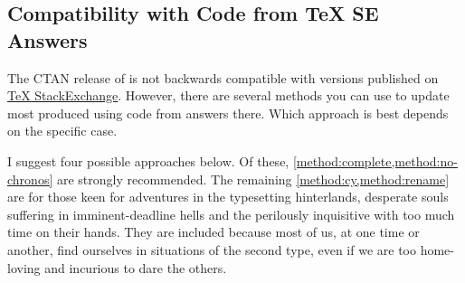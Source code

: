 \documentclass[10pt,british,a4paper]{ltxdoc}
\newcommand*\pkg[1]{\textpkg{#1}}
\begin{document}
\subsection{Compatibility with Code from \TeX{} SE Answers}\label{subsec:compat-texse}

The CTAN release of \pkg{chronos} is not backwards compatible with versions published on \href{https://tex.stackexchange.com/}{\TeX{} StackExchange}.
However, there are several methods you can use to update most  produced using code from answers there.
Which approach is best depends on the specific case.

I suggest four possible approaches below.
Of these, \cref{method:complete,method:no-chronos} are strongly recommended.
The remaining \cref{method:cy,method:rename} are for those keen for adventures in the typesetting hinterlands, desperate souls suffering in imminent-deadline hells and the perilously inquisitive with too much time on their hands.
They are included because most of us, at one time or another, find ourselves in situations of the second type, even if we are too home-loving and incurious to dare the others.
\end{document}
